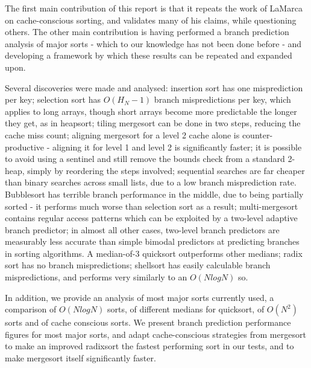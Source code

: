 The first main contribution of this report is that it repeats the work of LaMarca
on cache-conscious sorting, and validates many of his claims, while questioning
others. The other main contribution is having performed a branch prediction
analysis of major sorts - which to our knowledge has not been done before - and
developing a framework by which these results can be repeated and expanded upon.

Several discoveries were made and analysed: insertion sort has one misprediction
per key; selection sort has $O(H_N-1)$ branch mispredictions per key, which
applies to long arrays, though short arrays become more predictable the longer
they get, as in heapsort; tiling mergesort can be done in two steps, reducing
the cache miss count; aligning mergesort for a level 2 cache alone is
counter-productive - aligning it for level 1 and level 2 is significantly
faster; it is possible to avoid using a sentinel and still remove the bounds
check from a standard 2-heap, simply by reordering the steps involved;
sequential searches are far cheaper than binary searches across small lists, due
to a low branch misprediction rate. Bubblesort has terrible branch performance
in the middle, due to being partially sorted - it performs much worse than
selection sort as a result; multi-mergesort contains regular access patterns
which can be exploited by a two-level adaptive branch predictor; in almost all
other cases, two-level branch predictors are measurably less accurate than
simple bimodal predictors at predicting branches in sorting algorithms. A
median-of-3 quicksort outperforms other medians; radix sort has no branch
mispredictions; shellsort has easily calculable branch mispredictions, and
performs very similarly to an $O(NlogN)$ so. 

In addition, we provide an analysis of most major sorts currently used, a
comparison of $O(NlogN)$ sorts, of different medians for quicksort, of $O(N^2)$
sorts and of cache conscious sorts. We present branch prediction performance
figures for most major sorts, and adapt cache-conscious strategies from
mergesort to make an improved radixsort the fastest performing sort in our
tests, and to make mergesort itself significantly faster.
